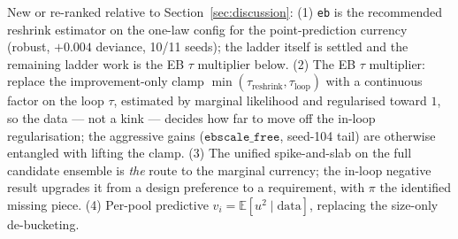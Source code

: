 New or re-ranked relative to Section~\ref{sec:discussion}: (1) \texttt{eb} is
the recommended reshrink estimator on the one-law config for the
point-prediction currency (robust, $+0.004$ deviance, 10/11 seeds); the ladder
itself is settled and the remaining ladder work is the EB $\tau$ multiplier
below. (2) The EB $\tau$ multiplier: replace the improvement-only clamp
$\min(\tau_{\mathrm{reshrink}},\tau_{\mathrm{loop}})$ with a continuous factor
on the loop $\tau$, estimated by marginal likelihood and regularised toward $1$,
so the data --- not a kink --- decides how far to move off the in-loop
regularisation; the aggressive gains ($\texttt{ebscale\_free}$, seed-104 tail)
are otherwise entangled with lifting the clamp. (3) The unified spike-and-slab
on the full candidate ensemble is \emph{the} route to the marginal currency;
the in-loop negative result upgrades it from a design preference to a
requirement, with $\pi$ the identified missing piece. (4) Per-pool predictive
$v_i=\mathbb E[u^2\mid\text{data}]$, replacing the size-only de-bucketing.
